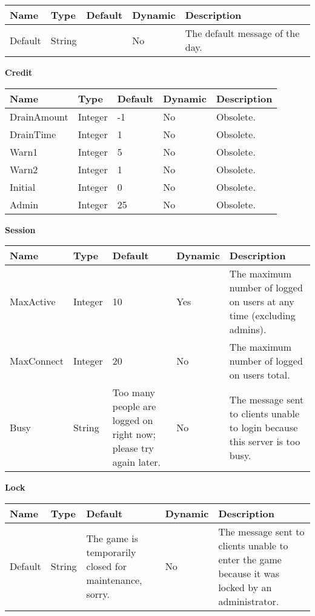 \begin{center}
\begin{tabular}{|l|l|p{1.5in}|l|p{2.9in}|} \hline
Name & Type & Default & Dynamic & Description 
\\ \hline
Default & String & & No & The default message of the day.
\\ \hline 
\end{tabular}

\textbf{Credit} \par

\begin{tabular}{|l|l|p{1.5in}|l|p{2.4in}|} \hline
Name & Type & Default & Dynamic & Description 
\\ \hline
DrainAmount & Integer & -1 & No & Obsolete.
\\ \hline 
DrainTime & Integer & 1 & No & Obsolete.
\\ \hline 
Warn1 & Integer & 5 & No & Obsolete.
\\ \hline 
Warn2 & Integer & 1 & No & Obsolete.
\\ \hline 
Initial & Integer & 0 & No & Obsolete.
\\ \hline 
Admin & Integer & 25 & No & Obsolete.
\\ \hline 
\end{tabular}

\textbf{Session} \par

\begin{tabular}{|l|l|p{1.5in}|l|p{2.6in}|} \hline
Name & Type & Default & Dynamic & Description 
\\ \hline
MaxActive & Integer & 10 & Yes & The maximum number of logged on users at any time
(excluding admins).
\\ \hline 
MaxConnect & Integer & 20 & No & The maximum number of logged on users total.
\\ \hline 
Busy & String & Too many people are logged on right now; please try again later. &
No & The message sent to clients unable to login because this server is too busy.
\\ \hline 
\end{tabular}

\textbf{Lock} \par

\begin{tabular}{|l|l|p{1.5in}|l|p{3.0in}|} \hline
Name & Type & Default & Dynamic & Description 
\\ \hline
Default & String & The game is temporarily closed for maintenance, sorry. & 
No & The message sent to clients unable to enter the game because it was locked
by an administrator.
\\ \hline 
\end{tabular}


\end{center}
